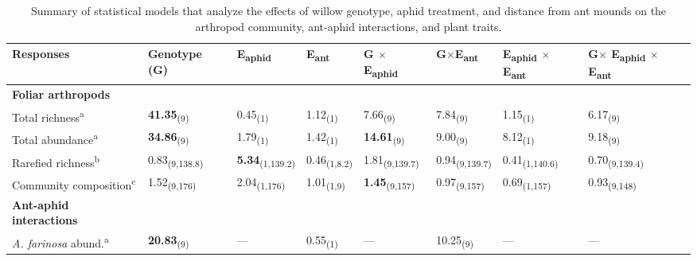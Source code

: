 \documentclass[11pt]{article}
\begin{document}
\begin{table}
\centering
\caption{Summary of statistical models that analyze the
effects of willow genotype, aphid treatment, and distance from ant
mounds on the arthropod community, ant-aphid interactions, and plant
traits.}
\label{aaCommTrait}
\begin{tabular}{@{}llllllll@{}}
\toprule
Responses                & Genotype (G)   & E\textsubscript{aphid}        &  E\textsubscript{ant}        & G $\times$ E\textsubscript{aphid}      & G$\times$E\textsubscript{ant}        & E\textsubscript{aphid} $\times$ E\textsubscript{ant}   & G$\times$ E\textsubscript{aphid} $\times$ E\textsubscript{ant} \\ \midrule
\textbf{Foliar arthropods}        &                &               &             &               &               &               &               \\
Total richness\textsuperscript{a}         & \textbf{41.35}\textsubscript{(9)}       & 0.45\textsubscript{(1)}       & 1.12\textsubscript{(1)}     & 7.66\textsubscript{(9)}       & 7.84\textsubscript{(9)}       & 1.15\textsubscript{(1)}       & 6.17\textsubscript{(9)}       \\
Total abundance\textsuperscript{a}         & \textbf{34.86}\textsubscript{(9)}       & 1.79\textsubscript{(1)}       & 1.42\textsubscript{(1)}     & \textbf{14.61}\textsubscript{(9)}      & 9.00\textsubscript{(9)}       & 8.12\textsubscript{(1)}       & 9.18\textsubscript{(9)}       \\
Rarefied richness\textsuperscript{b}       & 0.83\textsubscript{(9,138.8)}  & \textbf{5.34}\textsubscript{(1,139.2)} & 0.46\textsubscript{(1,8.2)} & 1.81\textsubscript{(9,139.7)} & 0.94\textsubscript{(9,139.7)} & 0.41\textsubscript{(1,140.6)} & 0.70\textsubscript{(9,139.4)} \\
Community composition\textsuperscript{c}   & 1.52\textsubscript{(9,176)}    & 2.04\textsubscript{(1,176)}   & 1.01\textsubscript{(1,9)}   & \textbf{1.45}\textsubscript{(9,157)}   & 0.97\textsubscript{(9,157)}   & 0.69\textsubscript{(1,157)}   & 0.93\textsubscript{(9,148)}   \\
\textbf{Ant-aphid interactions}   &                &               &             &               &               &               &               \\
\textit{A. farinosa} abund.\textsuperscript{a}       & \textbf{20.83}\textsubscript{(9)}       & ---             & 0.55\textsubscript{(1)}     & ---             & 10.25\textsubscript{(9)}      & ---             & ---             \\

\end{tabular}
\end{table}
\end{document}

